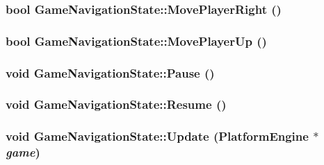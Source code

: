 \hypertarget{class_game_navigation_state_0b505a64bcf97883bb9e15d0d008174e}{
\subsubsection[{MovePlayerRight}]{\setlength{\rightskip}{0pt plus 5cm}bool GameNavigationState::MovePlayerRight ()}}
\label{class_game_navigation_state_0b505a64bcf97883bb9e15d0d008174e}


\hypertarget{class_game_navigation_state_fd803365fe0a32b60cf9105ee45b4042}{
\subsubsection[{MovePlayerUp}]{\setlength{\rightskip}{0pt plus 5cm}bool GameNavigationState::MovePlayerUp ()}}
\label{class_game_navigation_state_fd803365fe0a32b60cf9105ee45b4042}


\hypertarget{class_game_navigation_state_ac626b511de8af9f32b7a1492a10f861}{
\subsubsection[{Pause}]{\setlength{\rightskip}{0pt plus 5cm}void GameNavigationState::Pause ()}}
\label{class_game_navigation_state_ac626b511de8af9f32b7a1492a10f861}


\hypertarget{class_game_navigation_state_4d6aee55eddb1978f493206d985fb950}{
\subsubsection[{Resume}]{\setlength{\rightskip}{0pt plus 5cm}void GameNavigationState::Resume ()}}
\label{class_game_navigation_state_4d6aee55eddb1978f493206d985fb950}


\hypertarget{class_game_navigation_state_90f5e6d6287a875d8f2737180f46a004}{
\subsubsection[{Update}]{\setlength{\rightskip}{0pt plus 5cm}void GameNavigationState::Update ({\bf PlatformEngine} $\ast$ {\em game})}}
\label{class_game_navigation_state_90f5e6d6287a875d8f2737180f46a004}




